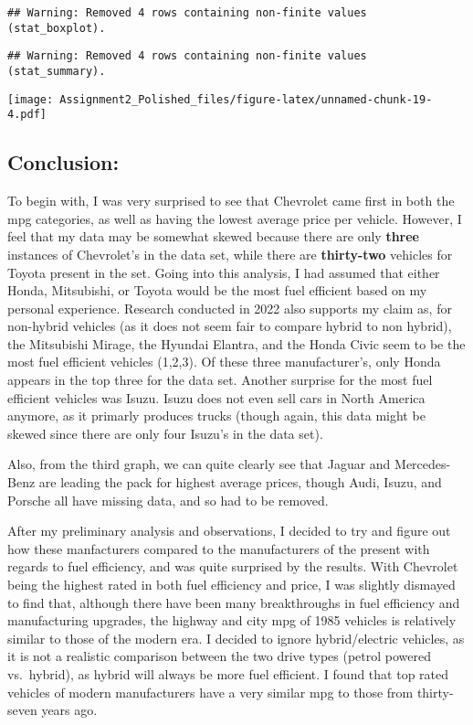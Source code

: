 \documentclass[
]{article}
\begin{document}
\begin{verbatim}
## Warning: Removed 4 rows containing non-finite values (stat_boxplot).
\end{verbatim}

\begin{verbatim}
## Warning: Removed 4 rows containing non-finite values (stat_summary).
\end{verbatim}

\texttt{[image: Assignment2\_Polished\_files/figure-latex/unnamed-chunk-19-4.pdf]}

\hypertarget{conclusion}{%
\subsection{Conclusion:}\label{conclusion}}

To begin with, I was very surprised to see that Chevrolet came first in
both the mpg categories, as well as having the lowest average price per
vehicle. However, I feel that my data may be somewhat skewed because
there are only \textbf{three} instances of Chevrolet's in the data set,
while there are \textbf{thirty-two} vehicles for Toyota present in the
set. Going into this analysis, I had assumed that either Honda,
Mitsubishi, or Toyota would be the most fuel efficient based on my
personal experience. Research conducted in 2022 also supports my claim
as, for non-hybrid vehicles (as it does not seem fair to compare hybrid
to non hybrid), the Mitsubishi Mirage, the Hyundai Elantra, and the
Honda Civic seem to be the most fuel efficient vehicles (1,2,3). Of
these three manufacturer's, only Honda appears in the top three for the
data set. Another surprise for the most fuel efficient vehicles was
Isuzu. Isuzu does not even sell cars in North America anymore, as it
primarly produces trucks (though again, this data might be skewed since
there are only four Isuzu's in the data set).

Also, from the third graph, we can quite clearly see that Jaguar and
Mercedes-Benz are leading the pack for highest average prices, though
Audi, Isuzu, and Porsche all have missing data, and so had to be
removed.

After my preliminary analysis and observations, I decided to try and
figure out how these manfacturers compared to the manufacturers of the
present with regards to fuel efficiency, and was quite surprised by the
results. With Chevrolet being the highest rated in both fuel efficiency
and price, I was slightly dismayed to find that, although there have
been many breakthroughs in fuel efficiency and manufacturing upgrades,
the highway and city mpg of 1985 vehicles is relatively similar to those
of the modern era. I decided to ignore hybrid/electric vehicles, as it
is not a realistic comparison between the two drive types (petrol
powered vs.~hybrid), as hybrid will always be more fuel efficient. I
found that top rated vehicles of modern manufacturers have a very
similar mpg to those from thirty-seven years ago.
\end{document}
